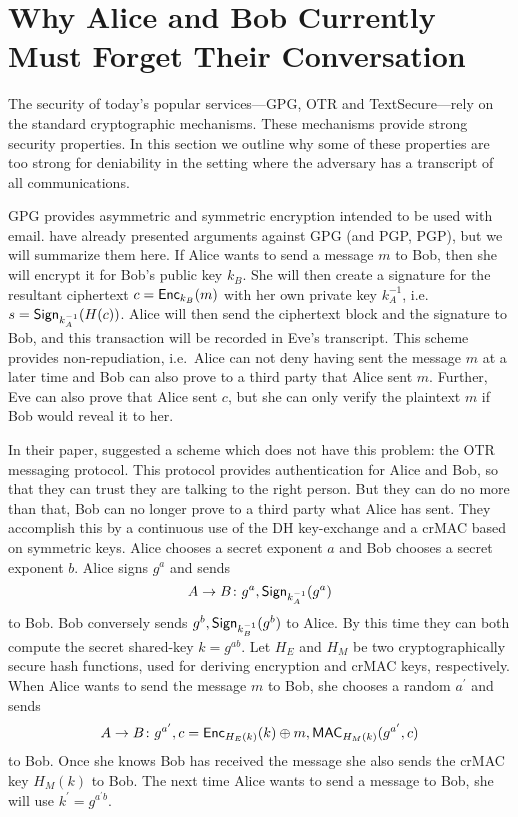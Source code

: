 

\section{Why Alice and Bob Currently Must Forget Their Conversation}
\label{sec:undeniability}

The security of today's popular services---\ac{GPG}, \ac{OTR} and 
TextSecure---rely on the standard cryptographic mechanisms.
These mechanisms provide strong security properties.
In this section we outline why some of these properties are too strong for 
deniability in the setting where the adversary has a transcript of all 
communications.

\ac{GPG} provides asymmetric and symmetric encryption intended to be used with 
email.
\citet{otr2004} have already presented arguments against \ac{GPG} (and 
\acl{PGP}, \acs{PGP}), but we will summarize them here.
If Alice wants to send a message \(m\) to Bob, then she will encrypt it for 
Bob's public key \(k_B\).
She will then create a signature for the resultant ciphertext \(c = \operatorname{\mathsf{Enc}}_{k_B}( 
m )\) with her own private key \(k_A^{-1}\), i.e.~\(s = \operatorname{\mathsf{Sign}}_{k_A^{-1}}( H(c) 
)\).
Alice will then send the ciphertext block and the signature to Bob, and this 
transaction will be recorded in Eve's transcript.
This scheme provides non-repudiation, i.e.~Alice can not deny having sent the 
message \(m\) at a later time and Bob can also prove to a third party that 
Alice sent \(m\).
Further, Eve can also prove that Alice sent \(c\), but she can only verify the 
plaintext \(m\) if Bob would reveal it to her.

In their paper, \citet{otr2004} suggested a scheme which does not have this 
problem: the \ac{OTR} messaging protocol.
This protocol provides authentication for Alice and Bob, so that they can trust 
they are talking to the right person.
But they can do no more than that, Bob can no longer prove to a third party 
what Alice has sent.
They accomplish this by a continuous use of the \ac{DH} key-exchange and 
a \ac{crMAC} based on symmetric keys.
Alice chooses a secret exponent \(a\) and Bob chooses a secret exponent \(b\).
Alice signs \(g^a\) and sends \[
  A\to B\colon g^a, \operatorname{\mathsf{Sign}}_{k_A^{-1}}( g^a )
\] to Bob.
Bob conversely sends \(g^b, \operatorname{\mathsf{Sign}}_{k_B^{-1}}( g^b )\) to Alice.
By this time they can both compute the secret shared-key \(k = g^{ab}\).
Let \(H_E\) and \(H_M\) be two cryptographically secure hash functions, used 
for deriving encryption and \ac{crMAC} keys, respectively.
When Alice wants to send the message \(m\) to Bob, she chooses a random 
\(a^\prime\) and sends \[
  A\to B\colon g^{a^\prime}, c = \operatorname{\mathsf{Enc}}_{H_E( k )}( k )\oplus m,
  \operatorname{\mathsf{MAC}}_{H_M( k )}( g^{a^\prime}, c )
\] to Bob.
Once she knows Bob has received the message she also sends the \ac{crMAC} key 
\(H_M( k )\) to Bob.
The next time Alice wants to send a message to Bob, she will use \(k^\prime 
= g^{a^\prime b}\).

